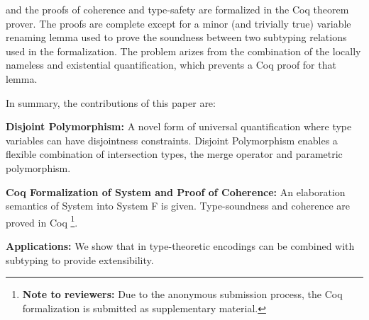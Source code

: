 \name and the proofs of coherence and type-safety are formalized in
the Coq theorem prover. The proofs are complete except for a minor
(and trivially true) variable renaming lemma used to prove the
soundness between two subtyping relations used in the
formalization. The problem arizes from the combination of the locally
nameless and existential quantification, which prevents a Coq proof
for that lemma.

In summary, the contributions of this paper are:

\begin{itemize*}

\item {\bf Disjoint Polymorphism:} A novel form of universal
quantification where type variables can have disjointness
constraints. Disjoint Polymorphism enables a flexible combination
of intersection types, the merge operator and parametric
polymorphism. 

\item {\bf Coq Formalization of System \name and Proof of Coherence:} An
  elaboration semantics of System \namedis into System F is
  given. Type-soundness and coherence are proved in Coq
\footnote{{\bf Note to reviewers:} Due
    to the anonymous submission process, the Coq formalization is submitted as supplementary material.}.

\item {\bf Applications:} We show that in \namedis
 type-theoretic encodings can be combined with subtyping to provide extensibility.

\end{itemize*}

